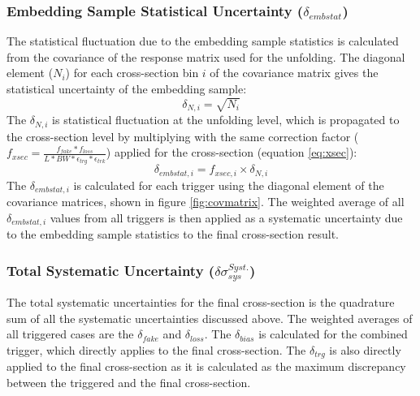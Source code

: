 
\subsubsection{Embedding Sample Statistical Uncertainty ($\delta_{embstat}$)}
The statistical fluctuation due to the embedding sample statistics is calculated from the covariance of the response matrix used for the unfolding. The diagonal element ($N_i$) for each cross-section bin $i$ of the covariance matrix gives the statistical uncertainty of the embedding sample: 
\begin{equation}
    \delta_{N, i} = \sqrt{N_i}
\end{equation}
The $\delta_{N, i}$ is statistical fluctuation at the unfolding level, which is propagated to the cross-section level by multiplying with the same correction factor ($f_{xsec} = \frac{f_{fake}*f_{loss}}{L*BW*\epsilon_{trg}*\epsilon_{trk}}$) applied for the cross-section (equation \ref{eq:xsec}):
 \begin{equation}
     \delta_{embstat, i} = f_{xsec, i}\times \delta_{N,i}
 \end{equation}
 The $\delta_{embstat, i}$ is calculated for each trigger using the diagonal element of the covariance matrices, shown in figure \ref{fig:covmatrix}. The weighted average of all $\delta_{embstat, i}$ values from all triggers is then applied as a systematic uncertainty due to the embedding sample statistics to the final cross-section result.
 


\subsubsection{Total Systematic Uncertainty ($\delta\sigma_{sys}^{Syst.}$)}

The total systematic uncertainties for the final cross-section is the quadrature sum of all the systematic uncertainties discussed above. The weighted averages of all triggered cases are the $\delta_{fake}$ and $\delta_{loss}$. The $\delta_{bias}$ is calculated for the combined trigger, which directly applies to the final cross-section. The $\delta_{trg}$ is also directly applied to the final cross-section as it is calculated as the maximum discrepancy between the triggered and the final cross-section. 

